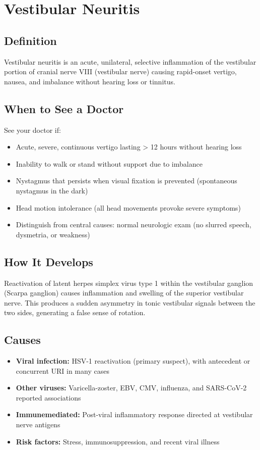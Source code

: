 \chapter{Vestibular Neuritis}

\section*{Definition}
Vestibular neuritis is an acute, unilateral, selective inflammation of the vestibular portion of cranial nerve VIII (vestibular nerve) causing rapid-onset vertigo, nausea, and imbalance without hearing loss or tinnitus.

\section*{When to See a Doctor}
See your doctor if:
\begin{itemize}
  \item Acute, severe, continuous vertigo lasting > 12 hours without hearing loss
  \item Inability to walk or stand without support due to imbalance
  \item Nystagmus that persists when visual fixation is prevented (spontaneous nystagmus in the dark)
  \item Head motion intolerance (all head movements provoke severe symptoms)
  \item Distinguish from central causes: normal neurologic exam (no slurred speech, dysmetria, or weakness)
\end{itemize}

\section*{How It Develops}
Reactivation of latent herpes simplex virus type 1 within the vestibular ganglion (Scarpa ganglion) causes inflammation and swelling of the superior vestibular nerve. This produces a sudden asymmetry in tonic vestibular signals between the two sides, generating a false sense of rotation.

\section*{Causes}
\begin{itemize}
  \item \textbf{Viral infection:} HSV-1 reactivation (primary suspect), with antecedent or concurrent URI in many cases
  \item \textbf{Other viruses:} Varicella-zoster, EBV, CMV, influenza, and SARS-CoV-2 reported associations
  \item \textbf{Immunemediated:} Post-viral inflammatory response directed at vestibular nerve antigens
  \item \textbf{Risk factors:} Stress, immunosuppression, and recent viral illness
\end{itemize}

